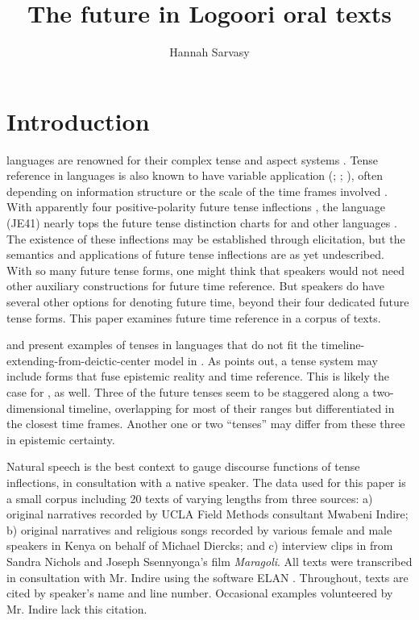 \documentclass[output=paper]{langsci/langscibook}
\title{The future in Logoori oral texts}
\author{%
Hannah Sarvasy \affiliation{Australian National University} 
}
\begin{document}
\section{Introduction} \label{sec:sarvasy:1}

 languages are renowned for their complex tense and aspect systems \citep{Nurse2003aspect,Nurse2008}. Tense reference in  languages is also known to have variable application (\citealt{Besha1989}; \citealt[101]{Nurse2003aspect}; \citealt{Crane2011}), often depending on information structure or the scale of the time frames involved \citep{BotneKershner2008,Botne2013}. With apparently four positive-polarity future tense inflections \citep{Mould1981,Leung1991,Nurse2003aspect}, the   language  (JE41) nearly tops the future tense distinction charts for  and other languages \citep[89]{Nurse2008}. The existence of these inflections may be established through elicitation, but the semantics and applications of  future tense inflections are as yet undescribed. With so many future tense forms, one might think that  speakers would not need other auxiliary constructions for future time reference. But  speakers do have several other options for denoting future time, beyond their four dedicated future tense forms. This paper examines future time reference in a corpus of  texts.

\citet{BotneKershner2008} and \citet{Botne2013} present examples of tenses in  languages that do not fit the timeline-extending-from-deictic-center model in \citet{Comrie1985}. As \citet{Botne2013} points out, a tense system may include forms that fuse epistemic reality and time reference. This is likely the case for , as well. Three of the  future tenses seem to be staggered along a two-dimensional timeline, overlapping for most of their ranges but differentiated in the closest time frames. Another one or two “tenses” may differ from these three in epistemic certainty. 

Natural speech is the best context to gauge discourse functions of tense inflections, in consultation with a  native speaker. The data used for this paper is a small corpus including 20  texts of varying lengths from three sources: a) original narratives recorded by UCLA Field Methods consultant Mwabeni Indire; b) original narratives and religious songs recorded by various female and male  speakers in Kenya on behalf of Michael Diercks; and c) interview clips in  from Sandra Nichols and Joseph Ssennyonga’s \citeyear{NicholsSsennyonga1976} film \textit{Maragoli}. All texts were transcribed in consultation with Mr. Indire using the software ELAN \citep{SloetjesWittenberg2008}. Throughout, texts are cited by speaker’s name and line number. Occasional examples volunteered by Mr. Indire lack this citation.
\end{document}
